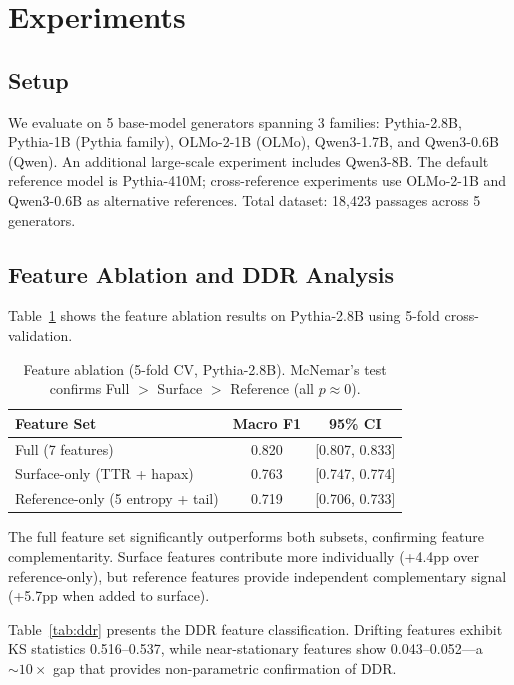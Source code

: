 \documentclass[11pt,a4paper]{article}
\begin{document}
\section{Experiments}
\label{sec:experiments}

\subsection{Setup}

We evaluate on 5 base-model generators spanning 3 families: Pythia-2.8B, Pythia-1B (Pythia family), OLMo-2-1B (OLMo), Qwen3-1.7B, and Qwen3-0.6B (Qwen). An additional large-scale experiment includes Qwen3-8B. The default reference model is Pythia-410M; cross-reference experiments use OLMo-2-1B and Qwen3-0.6B as alternative references. Total dataset: 18,423 passages across 5 generators.

\subsection{Feature Ablation and DDR Analysis}
\label{sec:ablation}

Table~\ref{tab:ablation} shows the feature ablation results on Pythia-2.8B using 5-fold cross-validation.

\begin{table}[t]
\centering
\small
\begin{tabular}{lcc}
\toprule
\textbf{Feature Set} & \textbf{Macro F1} & \textbf{95\% CI} \\
\midrule
Full (7 features) & 0.820 & [0.807, 0.833] \\
Surface-only (TTR + hapax) & 0.763 & [0.747, 0.774] \\
Reference-only (5 entropy + tail) & 0.719 & [0.706, 0.733] \\
\bottomrule
\end{tabular}
\caption{Feature ablation (5-fold CV, Pythia-2.8B). McNemar's test confirms Full $>$ Surface $>$ Reference (all $p \approx 0$).}
\label{tab:ablation}
\end{table}

The full feature set significantly outperforms both subsets, confirming feature complementarity. Surface features contribute more individually (+4.4pp over reference-only), but reference features provide independent complementary signal (+5.7pp when added to surface).

Table~\ref{tab:ddr} presents the DDR feature classification. Drifting features exhibit KS statistics 0.516--0.537, while near-stationary features show 0.043--0.052---a ${\sim}10\times$ gap that provides non-parametric confirmation of DDR.
\end{document}
